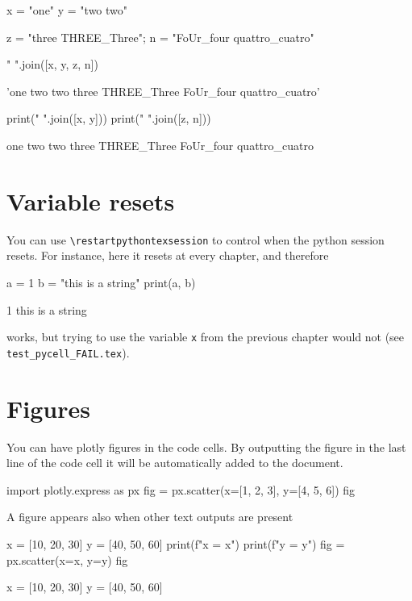 \documentclass{book}
\begin{document}
\begin{pycell}
x = "one"
y = "two two"
\end{pycell}

\begin{pycell}
z = "three THREE_Three"; n = "FoUr_four quattro_cuatro"
\end{pycell}

\begin{pycell}
" ".join([x, y, z, n])
\end{pycell}
\begin{pyexpectedoutput}
'one two two three THREE_Three FoUr_four quattro_cuatro'
\end{pyexpectedoutput}

\begin{pycell}
print(" ".join([x, y]))
print(" ".join([z, n]))
\end{pycell}
\begin{pyexpectedoutput}
one two two
three THREE_Three FoUr_four quattro_cuatro
\end{pyexpectedoutput}

\chapter{Variable resets}

You can use \texttt{\textbackslash restartpythontexsession} to control when the python session resets. For instance, here it resets at every chapter, and therefore

\begin{pycell}
a = 1
b = "this is a string"
print(a, b)
\end{pycell}
\begin{pyexpectedoutput}
1 this is a string
\end{pyexpectedoutput}

works, but trying to use the variable \texttt{x} from the previous chapter would not (see \texttt{test\_pycell\_FAIL.tex}).

\chapter{Figures}

You can have plotly figures in the code cells. By outputting the figure in the last line of the code cell it will be automatically added to the document.

\begin{pycell}
import plotly.express as px
fig = px.scatter(x=[1, 2, 3], y=[4, 5, 6])
fig
\end{pycell}

A figure appears also when other text outputs are present
\begin{pycell}
x = [10, 20, 30]
y = [40, 50, 60]
print(f"x = {x}")
print(f"y = {y}")
fig = px.scatter(x=x, y=y)
fig
\end{pycell}
\begin{pyexpectedoutput}
x = [10, 20, 30]
y = [40, 50, 60]
\end{pyexpectedoutput}
\end{document}
